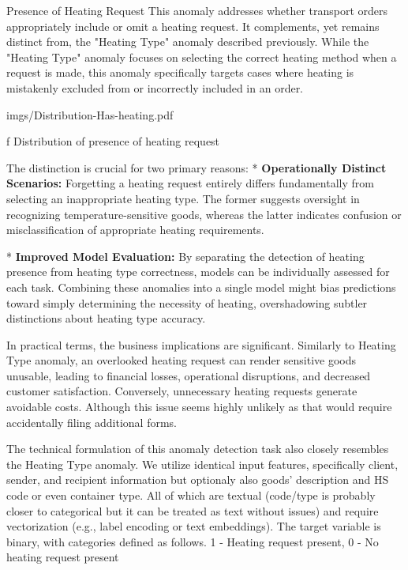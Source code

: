 \secc Presence of Heating Request
This anomaly addresses whether transport orders appropriately include or omit a heating request. It complements, yet remains distinct from, the "Heating Type" anomaly described previously. While the "Heating Type" anomaly focuses on selecting the correct heating method when a request is made, this anomaly specifically targets cases where heating is mistakenly excluded from or incorrectly included in an order.

\medskip
{}
\picw=15cm \cinspic imgs/Distribution-Has-heating.pdf
\caption/f Distribution of presence of heating request
\medskip

The distinction is crucial for two primary reasons:
\begitems
* {\bf Operationally Distinct Scenarios:}
Forgetting a heating request entirely differs fundamentally from selecting an inappropriate heating type. The former suggests oversight in recognizing temperature-sensitive goods, whereas the latter indicates confusion or misclassification of appropriate heating requirements.

* {\bf Improved Model Evaluation:}
By separating the detection of heating presence from heating type correctness, models can be individually assessed for each task. Combining these anomalies into a single model might bias predictions toward simply determining the necessity of heating, overshadowing subtler distinctions about heating type accuracy.
\enditems

In practical terms, the business implications are significant. Similarly to Heating Type anomaly, an overlooked heating request can render sensitive goods unusable, leading to financial losses, operational disruptions, and decreased customer satisfaction. Conversely, unnecessary heating requests generate avoidable costs. Although this issue seems highly unlikely as that would require accidentally filing additional forms.

The technical formulation of this anomaly detection task also closely resembles the Heating Type anomaly. We utilize identical input features, specifically client, sender, and recipient information but optionaly also goods' description and HS code or even container type. All of which are textual (code/type is probably closer to categorical but it can be treated as text without issues) and require vectorization (e.g., label encoding or text embeddings). The target variable is binary, with categories defined as follows. 1 - Heating request present, 0 - No heating request present

